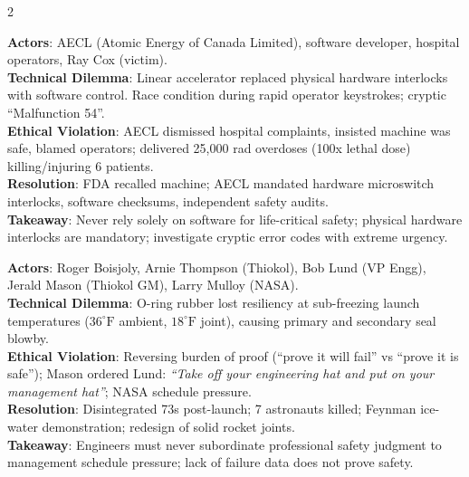 \documentclass[9pt,a4paper]{extarticle}
\begin{document}
\begin{multicols}{2}
\begin{tcolorbox}[casebox,title={11. Therac-25 Radiation Overdoses (1985--1987)}]
\textbf{Actors}: AECL (Atomic Energy of Canada Limited), software developer, hospital operators, Ray Cox (victim).\\
\textbf{Technical Dilemma}: Linear accelerator replaced physical hardware interlocks with software control. Race condition during rapid operator keystrokes; cryptic ``Malfunction 54''.\\
\textbf{Ethical Violation}: AECL dismissed hospital complaints, insisted machine was safe, blamed operators; delivered 25,000 rad overdoses (100x lethal dose) killing/injuring 6 patients.\\
\textbf{Resolution}: FDA recalled machine; AECL mandated hardware microswitch interlocks, software checksums, independent safety audits.\\
\textbf{Takeaway}: Never rely solely on software for life-critical safety; physical hardware interlocks are mandatory; investigate cryptic error codes with extreme urgency.
\end{tcolorbox}

\begin{tcolorbox}[casebox,title={12. Space Shuttle Challenger (1986)}]
\textbf{Actors}: Roger Boisjoly, Arnie Thompson (Thiokol), Bob Lund (VP Engg), Jerald Mason (Thiokol GM), Larry Mulloy (NASA).\\
\textbf{Technical Dilemma}: O-ring rubber lost resiliency at sub-freezing launch temperatures ($36^\circ\text{F}$ ambient, $18^\circ\text{F}$ joint), causing primary and secondary seal blowby.\\
\textbf{Ethical Violation}: Reversing burden of proof (``prove it will fail'' vs ``prove it is safe''); Mason ordered Lund: \textit{``Take off your engineering hat and put on your management hat''}; NASA schedule pressure.\\
\textbf{Resolution}: Disintegrated 73s post-launch; 7 astronauts killed; Feynman ice-water demonstration; redesign of solid rocket joints.\\
\textbf{Takeaway}: Engineers must never subordinate professional safety judgment to management schedule pressure; lack of failure data does not prove safety.
\end{tcolorbox}


\end{multicols}
\end{document}
